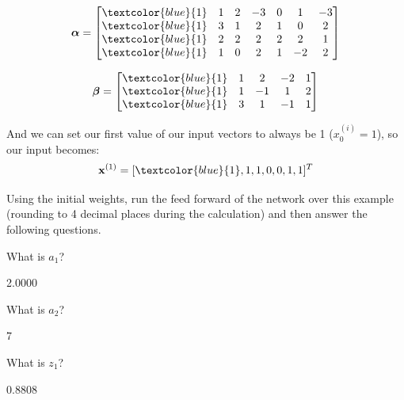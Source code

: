 \documentclass[11pt]{exam}
\numberwithin{equation}{section} %
\numberwithin{figure}{section} %
\numberwithin{table}{section} %
\newcommand{\xv}{\mathbf{x}}
\begin{document}
\begin{enumerate}
	$$\boldsymbol{\alpha}=
	    \begin{bmatrix}
	    \textcolor{blue}{1} & 1 & 2 & -3 & 0 & 1 & -3 \\
	    \textcolor{blue}{1} & 3 & 1 & 2 & 1 & 0 & 2 \\
	    \textcolor{blue}{1} & 2 & 2 & 2 & 2 & 2 & 1 \\
	    \textcolor{blue}{1} & 1 & 0 & 2 & 1 & -2 & 2
	    \end{bmatrix}$$
	    
	$$\boldsymbol{\beta}=
	    \begin{bmatrix}
	    \textcolor{blue}{1} & 1 & 2 & -2 & 1 \\
	    \textcolor{blue}{1} & 1 & -1 & 1 & 2 \\
	    \textcolor{blue}{1} & 3 & 1 & -1 & 1
	    \end{bmatrix}
	$$
	
	    And we can set our first value of our input vectors to always be 1 ($x_0^{(i)} = 1$), so our input becomes: $$\xv^{(1)}=[\textcolor{blue}{1},1,1,0,0,1,1]^T$$
	    
	     Using the initial weights, run the feed forward of the network over this example (rounding to 4 decimal places during the calculation) and then answer the following questions. 
	    
	    \begin{questions}
	        \question[1] What is $a_1$?
	        
	        \begin{tcolorbox}[fit,height=1cm, width=2cm, blank, borderline={1pt}{-2pt}]
			2.0000
	        \end{tcolorbox}
	        
	        
	        \question[1] What is $a_2$?
	        
	        \begin{tcolorbox}[fit,height=1cm, width=2cm, blank, borderline={1pt}{-2pt}]
			7
	        \end{tcolorbox}
	        
	        
	        
	        \question[1] What is $z_1$?
	        
	        \begin{tcolorbox}[fit,height=1cm, width=2cm, blank, borderline={1pt}{-2pt}]
			0.8808
	        \end{tcolorbox}
	        

\end{questions}
\end{enumerate}
\end{document}
